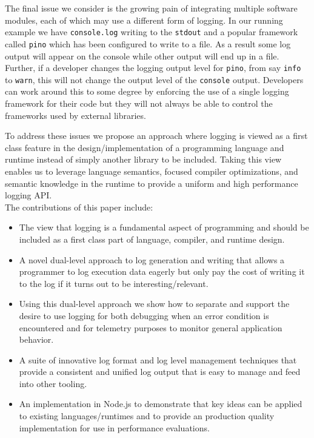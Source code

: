 \documentclass[sigplan,10pt,screen]{acmart}
\begin{document}
The final issue we consider is the growing pain of integrating multiple software 
modules, each of which may use a different form of logging. In our running example 
we have \texttt{console.log} writing to the \texttt{stdout} and a
popular framework called \texttt{pino} which has been configured to write to
a file. As a result some log output will appear on the console while other
output will end up in a file. Further, if a developer changes the logging output
level for \texttt{pino}, from say \texttt{info} to \texttt{warn}, this will
not change the output level of the \texttt{console} output. Developers can work
around this to some degree by enforcing the use of a single logging framework
for their code but they will not always be able to control the frameworks used
by external libraries.

To address these issues we propose an approach where logging is viewed as a first 
class feature in the design/implementation of a programming language and runtime 
instead of simply another library to be included. Taking this view enables us to 
leverage language semantics, focused compiler optimizations, and semantic knowledge 
in the runtime to provide a uniform and high performance logging API.\\

\noindent
The contributions of this paper include:
\begin{itemize}
\item The view that logging is a fundamental aspect of programming and should be
included as a first class part of language, compiler, and runtime design.

\item A novel dual-level approach to log generation and writing that allows a
programmer to log execution data eagerly but only pay the cost of writing it to
the log if it turns out to be interesting/relevant.

\item Using this dual-level approach we show how to separate and support the 
desire to use logging for both debugging when an error condition is encountered 
and for telemetry purposes to monitor general application behavior. 

\item A suite of innovative log format and log level management techniques that 
provide a consistent and unified log output that is easy to manage and feed into 
other tooling.

\item An implementation in Node.js to demonstrate that key ideas can be applied 
to existing languages/runtimes and to provide an production quality implementation 
for use in performance evaluations.
\end{itemize}
\end{document}
